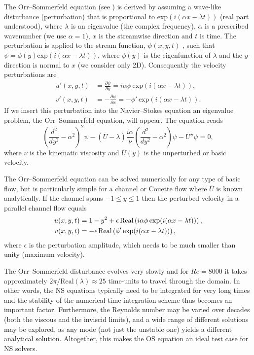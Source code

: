 The Orr--Sommerfeld equation (see \citet{Orzag1971}) is derived by
assuming a wave-like disturbance (perturbation) that is proportional
to $\text{exp}(i(\alpha x-\lambda t))$ (real part understood), where
$\lambda$ is an eigenvalue (the complex frequency), $\alpha$ is a
prescribed wavenumber (we use $\alpha=1$), $x$ is the streamwise
direction and $t$ is time. The perturbation is applied to the stream
function, $\psi(x,y,t)$ , such that $\psi=\phi(y) \text{exp}(i(\alpha
x- \lambda t))$, where $\phi(y)$ is the eigenfunction of $\lambda$ and
the $y$-direction is normal to $x$ (we consider only 2D). Consequently
the velocity perturbations are
\begin{align}
 u'(x,y,t)&=\frac{\partial \psi}{\partial y}=i\alpha \phi \, \text{exp}(i(\alpha x- \lambda t)),\\
 v'(x,y,t)&=-\frac{\partial \psi}{\partial x}=-\phi' \, \text{exp}(i(\alpha x- \lambda t)).
\end{align}
If we insert this perturbation into the Navier--Stokes equation an
eigenvalue problem, the Orr--Sommerfeld equation, will appear. The
equation reads
\begin{equation}
 \left( \frac{d^2}{dy^2}-\alpha^2\right)^2\psi - \left(\overline{U}-\lambda \right) \frac{i \alpha}{\nu} \left( \frac{d^2}{dy^2}-\alpha^2\right)\psi - \overline{U}''\psi=0,
 \label{eq:mortensen:OrrS}
\end{equation}
where $\nu$ is the kinematic viscosity and $\overline{U}(y)$ is the unperturbed or basic velocity.

The Orr--Sommerfeld equation can be solved numerically for any type of
basic flow, but is particularly simple for a channel or Couette flow
where $\overline{U}$ is known analytically. If the channel spans
$-1\leqslant y \leqslant 1$ then the perturbed velocity in a parallel
channel flow equals
\begin{align}
 u(x,y,t)&=1-y^2+\epsilon \,\text{Real}\left(i\alpha \phi \, \text{exp}(i(\alpha x-\lambda t))\right), \notag \\
 v(x,y,t)&=-\epsilon \, \text{Real}\left(\phi' \, \text{exp}(i(\alpha x-\lambda t))\right),
\label{eq:mortensen:channel}
\end{align}
where $\epsilon$ is the perturbation amplitude, which needs to be much smaller than unity (maximum velocity).

The Orr--Sommerfeld disturbance evolves very slowly and for $Re=8000$
it takes approximately $2 \pi/\text{Real}(\lambda)\approx 25$
time-units to travel through the domain. In other words, the NS
equations typically need to be integrated for very long times and the
stability of the numerical time integration scheme thus becomes an
important factor. Furthermore, the Reynolds number may be varied over
decades (both the viscous and the inviscid limits), and a wide range
of different solutions may be explored, as any mode (not just the
unstable one) yields a different analytical solution. Altogether, this
makes the OS equation an ideal test case for NS solvers.

